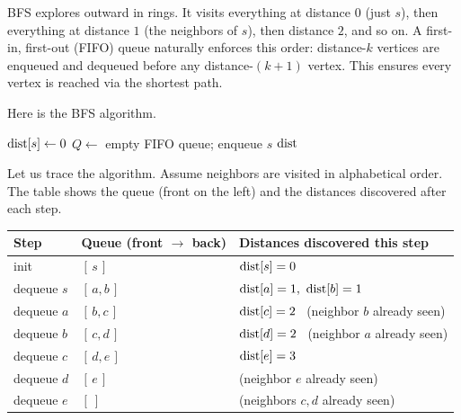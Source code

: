 \begin{intuitionbox}
BFS explores outward in rings. It visits everything at distance $0$ (just $s$), then everything at distance $1$ (the neighbors of $s$), then distance $2$, and so on. A first-in, first-out (FIFO) queue naturally enforces this order: distance-$k$ vertices are enqueued and dequeued before any distance-$(k+1)$ vertex. This ensures every vertex is reached via the shortest path.
\end{intuitionbox}

Here is the BFS algorithm.

\begin{algorithm}[H]
\caption{Breadth-First Search from a source}
\label{ch00:alg-bfs}
$\operatorname{dist}[s] \gets 0$\;
$Q \gets$ empty FIFO queue; enqueue $s$\;
\Return $\operatorname{dist}$\;
\end{algorithm}

Let us trace the algorithm. Assume neighbors are visited in alphabetical order. The table shows the queue (front on the left) and the distances discovered after each step.

\begin{center}
\renewcommand{\arraystretch}{1.25}
\begin{tabular}{l l l}
\toprule
\textbf{Step} & \textbf{Queue (front $\to$ back)} & \textbf{Distances discovered this step} \\
\midrule
init        & $[\,s\,]$    & $\operatorname{dist}[s]=0$ \\
dequeue $s$ & $[\,a,b\,]$  & $\dist[a]=1,\ \dist[b]=1$ \\
dequeue $a$ & $[\,b,c\,]$  & $\operatorname{dist}[c]=2$ \ (neighbor $b$ already seen) \\
dequeue $b$ & $[\,c,d\,]$  & $\operatorname{dist}[d]=2$ \ (neighbor $a$ already seen) \\
dequeue $c$ & $[\,d,e\,]$  & $\operatorname{dist}[e]=3$ \\
dequeue $d$ & $[\,e\,]$    & (neighbor $e$ already seen) \\
dequeue $e$ & $[\ ]$       & (neighbors $c,d$ already seen) \\
\bottomrule
\end{tabular}
\end{center}

